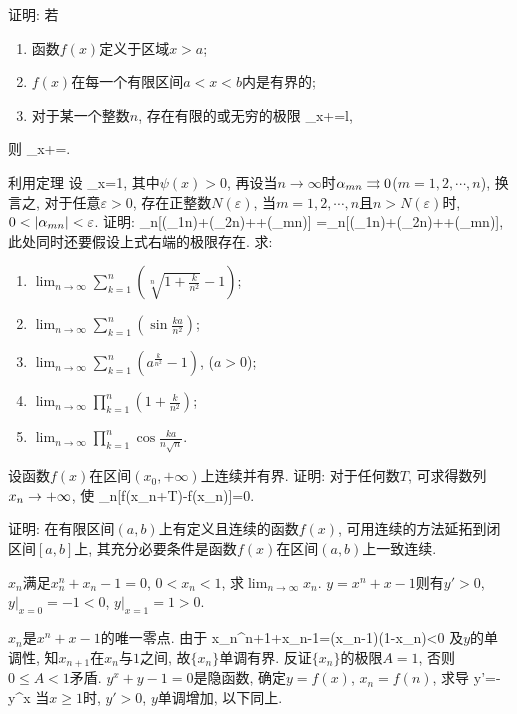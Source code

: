 \bq{}{}
证明: 若
\begin{enumerate}[(1)]
 \item 函数$f(x)$定义于区域$x>a$;
 \item $f(x)$在每一个有限区间$a<x<b$内是有界的;
 \item 对于某一个整数$n$, 存在有限的或无穷的极限
 \bee
 \lim_{x\to+\infty}=l,
 \eee
\end{enumerate}
则
\bee
\lim_{x\to+\infty}=.
\eee
\eq
{}

\bq{}{}
利用定理
\bt{}{}
设
\bee
\lim_{x}=1,
\eee
其中$\psi(x)>0$, 再设当$n\to\infty$时$\alpha_{mn}\rightrightarrows0$($m=1,2,\cdots,n$), 
换言之, 对于任意$\varepsilon>0$, 存在正整数$N(\varepsilon)$, 当$m=1,2,\cdots,n$且$n>N(\varepsilon)$时, 
$0<\left\lvert\alpha_{mn}\right\rvert<\varepsilon$. 证明:
\bee
\lim_{n\to\infty}[\phi(\a_{1n})+\phi(\a_{2n})+\cdots+\phi(\a_{mn})]
=\lim_{n\to\infty}[\psi(\a_{1n})+\psi(\a_{2n})+\cdots+\psi(\a_{mn})],
\eee
此处同时还要假设上式右端的极限存在.
\et
求:
\begin{enumerate}[(1)]
 \item $\lim_{n\to\infty}\sum_{k=1}^{n}\left(\sqrt[n]{1+\frac{k}{n^2}}-1\right)$;
 \item $\lim_{n\to\infty}\sum_{k=1}^{n}\left(\sin\frac{ka}{n^2}\right)$;
 \item $\lim_{n\to\infty}\sum_{k=1}^{n}\left(a^{\frac{k}{n^2}}-1\right)$, ($a>0$);
 \item $\lim_{n\to\infty}\prod_{k=1}^{n}\left(1+\frac{k}{n^2}\right)$;
 \item $\lim_{n\to\infty}\prod_{k=1}^{n}\cos\frac{ka}{n\sqrt{n}}$.
\end{enumerate}
\eq

\bq{}{}
设函数$f(x)$在区间$(x_0,+\infty)$上连续并有界. 证明: 对于任何数$T$, 可求得数列$x_n\to+\infty$, 
使
\bee
\lim_{n\to\infty}[f(x_n+T)-f(x_n)]=0.
\eee
\eq

\bq{}{}
证明: 在有限区间$(a,b)$上有定义且连续的函数$f(x)$, 可用连续的方法延拓到闭区间$[a,b]$上, 
其充分必要条件是函数$f(x)$在区间$(a,b)$上一致连续.
\eq

\bq{}{}
$x_n$满足$x_n^n+x_n-1=0$, $0<x_n<1$, 求$\lim_{n\to\infty}x_n$.
\eq
\ba
$y=x^n+x-1$则有$y'>0$, $y\vert_{x=0}=-1<0$, $y\vert_{x=1}=1>0$.

$x_n$是$x^n+x-1$的唯一零点. 由于
\bee
x_{n}^{n+1}+x_n-1=(x_n-1)(1-x_n)<0
\eee
及$y$的单调性, 知$x_{n+1}$在$x_n$与$1$之间, 故$\{x_n\}$单调有界.
反证$\{x_n\}$的极限$A=1$, 否则$0\le A<1$矛盾.
\ea
\ba
$y^x+y-1=0$是隐函数, 确定$y=f(x)$, $x_n=f(n)$, 求导
\bee
y'=-y^x\cdot{}
\eee
当$x\ge1$时, $y'>0$, $y$单调增加, 以下同上.
\ea

